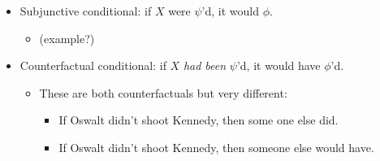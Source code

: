 \begin{itemize}
    \item Subjunctive conditional: if $X$ were $\psi$'d, it would $\phi$.
    \begin{itemize}
    \item (example?)
    \end{itemize}
    \item Counterfactual conditional: if $X$ \emph{had been} $\psi$'d, it would have $\phi$'d.
    \begin{itemize}
    \item These are both counterfactuals but very different:
    \begin{itemize}
        \item If Oswalt didn't shoot Kennedy, then some one else did.
        \item If Oswalt didn't shoot Kennedy, then someone else would have.
    \end{itemize}
\end{itemize}

\end{itemize}

